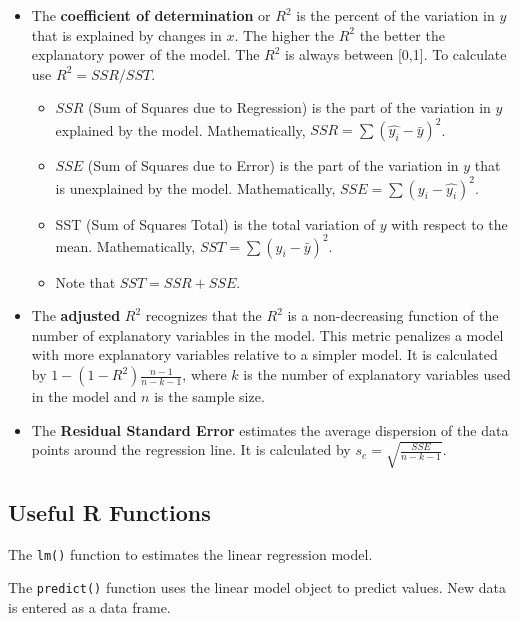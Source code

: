 \documentclass[
  letterpaper,
  DIV=11,
  numbers=noendperiod]{scrreprt}
\begin{document}
\begin{itemize}
\item
  The \textbf{coefficient of determination} or \(R^2\) is the percent of
  the variation in \(y\) that is explained by changes in \(x\). The
  higher the \(R^2\) the better the explanatory power of the model. The
  \(R^2\) is always between {[}0,1{]}. To calculate use \(R^2=SSR/SST\).

  \begin{itemize}
  \item
    \(SSR\) (Sum of Squares due to Regression) is the part of the
    variation in \(y\) explained by the model. Mathematically,
    \(SSR=\sum{(\hat{y_i}-\bar{y})^2}\).
  \item
    \(SSE\) (Sum of Squares due to Error) is the part of the variation
    in \(y\) that is unexplained by the model. Mathematically,
    \(SSE=\sum{(y_i-\hat{y_i})^2}\).
  \item
    SST (Sum of Squares Total) is the total variation of \(y\) with
    respect to the mean. Mathematically, \(SST=\sum{(y_i-\bar{y})^2}\).
  \item
    Note that \(SST=SSR+SSE\).
  \end{itemize}
\item
  The \textbf{adjusted} \(R^2\) recognizes that the \(R^2\) is a
  non-decreasing function of the number of explanatory variables in the
  model. This metric penalizes a model with more explanatory variables
  relative to a simpler model. It is calculated by
  \(1-(1-R^2) \frac {n-1}{n-k-1}\), where \(k\) is the number of
  explanatory variables used in the model and \(n\) is the sample size.
\item
  The \textbf{Residual Standard Error} estimates the average dispersion
  of the data points around the regression line. It is calculated by
  \(s_e =\sqrt{\frac{SSE}{n-k-1}}\).
\end{itemize}

\hypertarget{useful-r-functions-6}{%
\subsection*{Useful R Functions}\label{useful-r-functions-6}}

The \texttt{lm()} function to estimates the linear regression model.

The \texttt{predict()} function uses the linear model object to predict
values. New data is entered as a data frame.
\end{document}
